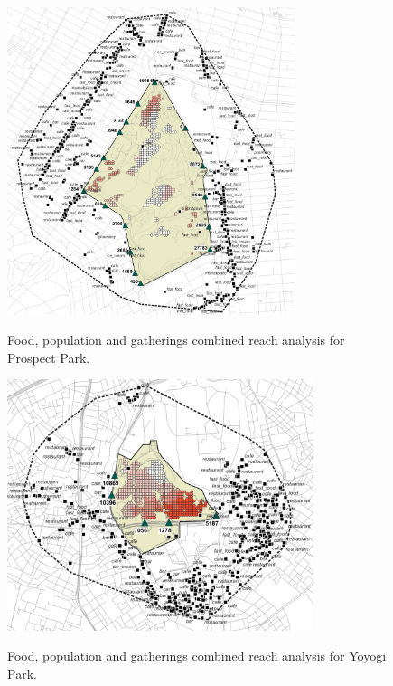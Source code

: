 \begin{figure}[H]
  \centering
  \captionsetup{width=0.9\textwidth}
  \includegraphics[width=0.75\textwidth]{images/network/prospect_gath_food_pop.png} \\
  \caption[Prospect Park - reach]{Food, population and gatherings combined reach analysis for Prospect Park.}
  \label{fig:prospect_reach}
\end{figure}

\begin{figure}[H]
  \centering
  \captionsetup{width=0.9\textwidth}
  \includegraphics[width=0.8\textwidth]{images/network/yoyogi_gath_food_pop.png} \\
  \caption[Yoyogi Park - reach]{Food, population and gatherings combined reach analysis for Yoyogi Park.}
  \label{fig:yoyogi_reach}
\end{figure}

